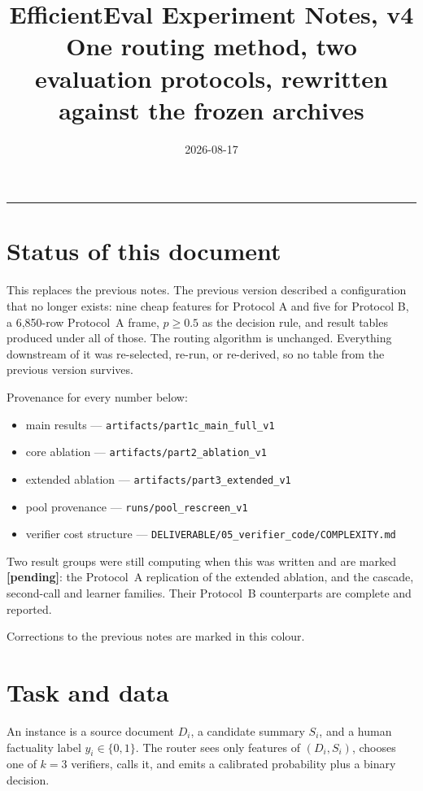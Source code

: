 \documentclass[10pt,a4paper]{article}
\title{\textbf{EfficientEval Experiment Notes, v4}\\[3pt]
\large One routing method, two evaluation protocols, rewritten against the frozen archives}
\author{}\date{2026-08-17}
\newcommand{\fix}[1]{\textcolor{red!65!black}{#1}}
\begin{document}
\maketitle
\vspace{-2.2em}
\hrule

\section*{Status of this document}

This replaces the previous notes. The previous version described a configuration that no longer
exists: nine cheap features for Protocol A and five for Protocol B, a 6{,}850-row Protocol~A
frame, $p\ge0.5$ as the decision rule, and result tables produced under all of
those. The routing algorithm is unchanged. Everything downstream of it was re-selected, re-run,
or re-derived, so no table from the previous version survives.

Provenance for every number below:
\begin{itemize}
\item main results --- \texttt{artifacts/part1c\_main\_full\_v1}
\item core ablation --- \texttt{artifacts/part2\_ablation\_v1}
\item extended ablation --- \texttt{artifacts/part3\_extended\_v1}
\item pool provenance --- \texttt{runs/pool\_rescreen\_v1}
\item verifier cost structure --- \texttt{DELIVERABLE/05\_verifier\_code/COMPLEXITY.md}
\end{itemize}

Two result groups were still computing when this was written and are marked
\textbf{[pending]}: the Protocol~A replication of the extended ablation, and the cascade,
second-call and learner families. Their Protocol~B counterparts are complete and reported.

Corrections to the previous notes are marked \fix{in this colour}.

\section{Task and data}

An instance is a source document $D_i$, a candidate summary $S_i$, and a human factuality label
$y_i\in\{0,1\}$. The router sees only features of $(D_i,S_i)$, chooses one of $k=3$ verifiers,
calls it, and emits a calibrated probability plus a binary decision.
\end{document}
